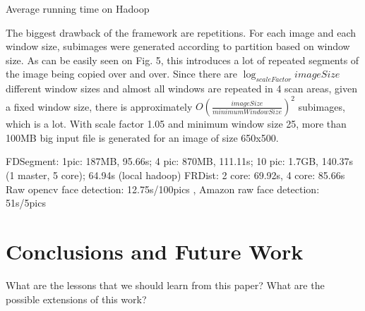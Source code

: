 \documentclass[11pt, draftclsnofoot, onecolumn]{IEEEtran}
\begin{document}
Average running time on Hadoop

The biggest drawback of the framework are repetitions. For each image and each window size, subimages were generated according to partition based on window size. As can be easily seen on Fig. 5, this introduces a lot of repeated segments of the image being copied over and over. Since there are $\log_{scaleFactor}{imageSize}$ different window sizes and almost all windows are repeated in 4 scan areas, given a fixed window size, there is approximately $O(\frac{imageSize}{minimumWindowSize})^{2} $ subimages, which is a lot. With scale factor 1.05 and minimum window size 25, more than 100MB big input file is generated for an image of size 650x500.

FDSegment: 1pic: 187MB, 95.66s; 4 pic: 870MB, 111.11s; 10 pic: 1.7GB, 140.37s (1 master, 5 core); 64.94s (local hadoop)
FRDist: 2 core: 69.92s, 4 core: 85.66s
Raw opencv face detection: 12.75s/100pics , Amazon raw face detection: 51s/5pics

\section{Conclusions and Future Work} \label{sec:conclusion}

What are the lessons that we should learn from this paper? 
What are the possible extensions of this work?


   
\end{document}
